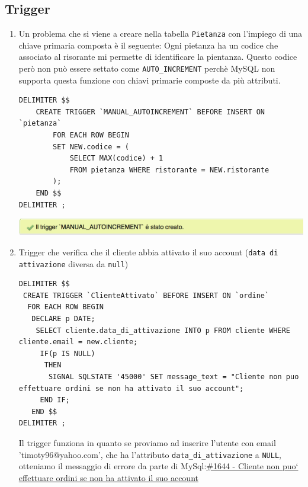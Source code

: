 \documentclass[10pt]{article}
\begin{document}
		\subsection{Trigger}
		\begin{enumerate}[noitemsep]
		\item Un problema che si viene a creare nella tabella \texttt{Pietanza} con l'impiego di una chiave primaria composta \`e il seguente: Ogni pietanza ha un codice che associato al risorante mi permette di identificare la pientanza. Questo codice per\`o non pu\`o essere settato come \texttt{AUTO\_INCREMENT} perch\`e MySQL non supporta questa funzione con chiavi primarie composte da pi\`u attributi.
		\begin{lstlisting}[style=Mysql]
DELIMITER $$		
	CREATE TRIGGER `MANUAL_AUTOINCREMENT` BEFORE INSERT ON `pietanza`
		FOR EACH ROW BEGIN
		SET NEW.codice = (
			SELECT MAX(codice) + 1
			FROM pietanza WHERE ristorante = NEW.ristorante
		);
	END $$		
DELIMITER ;
\end{lstlisting}
\begin{center}
\hspace*{-1cm}
\includegraphics[scale=0.9]{trigger1.png}
\hspace*{-1cm}
\end{center}
	\item Trigger che verifica che il cliente abbia attivato il suo account (\texttt{data di attivazione} diversa da \texttt{null})
	\begin{lstlisting}[style=Mysql]
DELIMITER $$	
 CREATE TRIGGER `ClienteAttivato` BEFORE INSERT ON `ordine`
  FOR EACH ROW BEGIN
   DECLARE p DATE;
    SELECT cliente.data_di_attivazione INTO p FROM cliente WHERE cliente.email = new.cliente;
     IF(p IS NULL)
      THEN 
       SIGNAL SQLSTATE '45000' SET message_text = "Cliente non puo  effettuare ordini se non ha attivato il suo account";
     END IF;
   END $$
DELIMITER ;	\end{lstlisting}
Il trigger funziona in quanto se proviamo ad inserire l'utente con email 'timoty96@yahoo.com', che ha l'attributo \texttt{data\_di\_attivazione} a \texttt{NULL}, otteniamo il messaggio di errore da parte di MySql:\newline \underline{\#1644 - Cliente non puo`  effettuare ordini se non ha attivato il suo account}
	\end{enumerate}
\end{document}

